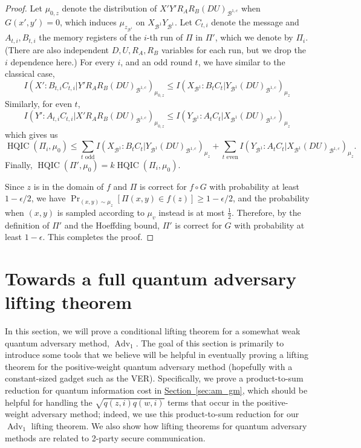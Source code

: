 \documentclass[10pt,a4paper]{article}
\theoremstyle{definition}
\renewcommand{\sec}[1]{\hyperref[sec:#1]{Section~\ref*{sec:#1}}}
\renewcommand{\>}{\rangle}
\newcommand{\<}{\langle}
\newcommand{\cB}{\mathcal{B}}
\DeclareMathOperator{\Adv}{Adv}
\DeclareMathOperator{\HQIC}{HQIC}
\begin{document}
\begin{proof}
Let $\mu_{0,z}$ denote the distribution of $X'Y'R_AR_B(DU)_{\cB^{1,c}}$ when $G(x',y')=0$, which induces $\mu_{z_{\cB^1}}$ on $X_{\cB^1}Y_{\cB^1}$. Let $C_{t,i}$ denote the message and $A_{t,i}, B_{t,i}$ the memory registers of the $i$-th run of $\Pi$ in $\Pi'$, which we denote by $\Pi_i$. (There are also independent $D, U, R_A, R_B$ variables for each run, but we drop the $i$ dependence here.) For every $i$, and an odd round $t$, we have similar to the classical case,
\[ I(X':B_{t,i}C_{t,i}|Y'R_AR_B(DU)_{\cB^{1,c}})_{\mu_{0,z}} \leq I(X_{\cB^1}:B_tC_t|Y_{\cB^1}(DU)_{\cB^{1,c}})_{\mu_z} \]
Similarly, for even $t$,
\[ I(Y':A_{t,i}C_{t,i}|X'R_AR_B(DU)_{\cB^{1,c}})_{\mu_{0,z}} \leq I(Y_{\cB^1}:A_tC_t|X_{\cB^1}(DU)_{\cB^{1,c}})_{\mu_z} \]
which gives us
\[ \HQIC(\Pi_i, \mu_0) \leq \sum_{t\text{ odd}}I(X_{\cB^1}:B_tC_t|Y_{\cB^1}(DU)_{\cB^{1,c}})_{\mu_z} + \sum_{t\text{ even}}I(Y_{\cB^1}:A_tC_t|X_{\cB^1}(DU)_{\cB^{1,c}})_{\mu_z}.\]
Finally, $\HQIC(\Pi', \mu_0) = k\HQIC(\Pi_i,\mu_0)$.

Since $z$ is in the domain of $f$ and $\Pi$ is correct for $f\circ G$ with probability at least $1-\epsilon/2$, we have $\Pr_{(x,y) \sim \mu_z}[\Pi(x,y) \in f(z)] \geq 1-\epsilon/2$, and the probability when $(x,y)$ is sampled according to $\mu_v$ instead is at most $\frac{1}{2}$. Therefore, by the definition of $\Pi'$ and the Hoeffding bound, $\Pi'$ is correct for $G$ with probability at least $1-\epsilon$. This completes the proof.
\end{proof}




\section{Towards a full quantum adversary lifting theorem}
\label{sec:Adv_one}

In this section, we will prove a conditional
lifting theorem for a somewhat weak
quantum adversary method, $\Adv_1$. The goal
of this section is primarily to introduce some tools
that we believe will be helpful in eventually
proving a lifting theorem for the positive-weight
quantum adversary method (hopefully
with a constant-sized gadget such as the \textsc{VER}).
Specifically, we prove a product-to-sum reduction
for quantum information cost in \sec{am_gm},
which should be helpful for handling the
$\sqrt{q(z,i)q(w,i)}$ terms that occur in the positive-weight
adversary method; indeed, we use this product-to-sum
reduction for our $\Adv_1$ lifting theorem.
We also show how lifting theorems for quantum adversary
methods are related to 2-party secure communication.
\end{document}
